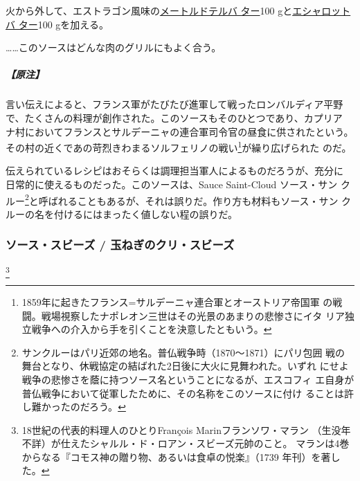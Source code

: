 \begin{recette}
火から外して、エストラゴン風味の\protect\hyperlink{beurre-maitre-d-hotel}{メートルドテルバ
ター}100 gと\protect\hyperlink{beurre-d-echalote}{エシャロットバ
ター}100 gを加える。

\ldots{}\ldots{}このソースはどんな肉のグリルにもよく合う。

\hypertarget{nota-sauce-solferino}{%
\subparagraph{【原注】}\label{nota-sauce-solferino}}

言い伝えによると、フランス軍がたびたび進軍して戦ったロンバルディア平野
で、たくさんの料理が創作された。このソースもそのひとつであり、カプリア
ナ村においてフランスとサルデーニャの連合軍司令官の昼食に供されたという。
その村の近くであの苛烈きわまるソルフェリノの戦い\footnote{1859年に起きたフランス=サルデーニャ連合軍とオーストリア帝国軍
  の戦闘。戦場視察したナポレオン三世はその光景のあまりの悲惨さにイタ
  リア独立戦争への介入から手を引くことを決意したともいう。}が繰り広げられた
のだ。

伝えられているレシピはおそらくは調理担当軍人によるものだろうが、充分に
日常的に使えるものだった。このソースは、Sauce Saint-Cloud ソース・サン
クルー\footnote{サンクルーはパリ近郊の地名。普仏戦争時（1870〜1871）にパリ包囲
  戦の舞台となり、休戦協定の結ばれた2日後に大火に見舞われた。いずれ
  にせよ戦争の悲惨さを蔭に持つソース名ということになるが、エスコフィ
  エ自身が普仏戦争において従軍したために、その名称をこのソースに付け
  ることは許し難かったのだろう。}と呼ばれることもあるが、それは誤りだ。作り方も材料もソース・サン
クルーの名を付けるにはまったく値しない程の誤りだ。

\maeaki

\hypertarget{sauce-soubise}{%
\subsubsection{ソース・スビーズ /
玉ねぎのクリ・スビーズ}\label{sauce-soubise}}

\footnote{18世紀の代表的料理人のひとりFrançois
  Marinフランソワ・マラン
  （生没年不詳）が仕えたシャルル・ド・ロアン・スビーズ元帥のこと。
  マランは4巻からなる『コモス神の贈り物、あるいは食卓の悦楽』（1739
  年刊）を著した。}



\end{recette}
